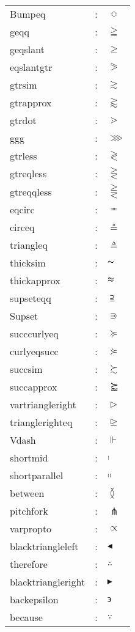 \documentclass{article}
\begin{document}
\begin{tabular}{lll}
Bumpeq & : & $\Bumpeq$\\
geqq & : & $\geqq$\\
geqslant & : & $\geqslant$\\
eqslantgtr & : & $\eqslantgtr$\\
gtrsim & : & $\gtrsim$\\
gtrapprox & : & $\gtrapprox$\\
gtrdot & : & $\gtrdot$\\
ggg & : & $\ggg$\\
gtrless & : & $\gtrless$\\
gtreqless & : & $\gtreqless$\\
gtreqqless & : & $\gtreqqless$\\
eqcirc & : & $\eqcirc$\\
circeq & : & $\circeq$\\
triangleq & : & $\triangleq$\\
thicksim & : & $\thicksim$\\   
thickapprox & : & $\thickapprox$\\  
supseteqq & : & $\supseteqq$\\
Supset & : & $\Supset$\\
succcurlyeq & : & $\succcurlyeq$\\
curlyeqsucc & : & $\curlyeqsucc$\\
succsim & : & $\succsim$\\
succapprox & : & $\succapprox$\\
vartriangleright & : & $\vartriangleright$\\
trianglerighteq & : & $\trianglerighteq$\\
Vdash & : & $\Vdash$\\
shortmid & : & $\shortmid$\\             
shortparallel & : & $\shortparallel$\\        
between & : & $\between$\\
pitchfork & : & $\pitchfork$\\
varpropto & : & $\varpropto$\\
blacktriangleleft & : & $\blacktriangleleft$\\
therefore & : & $\therefore$\\
blacktriangleright & : & $\blacktriangleright$\\
backepsilon & : & $\backepsilon$\\
because & : & $\because$\\
\end{tabular}
\end{document}
